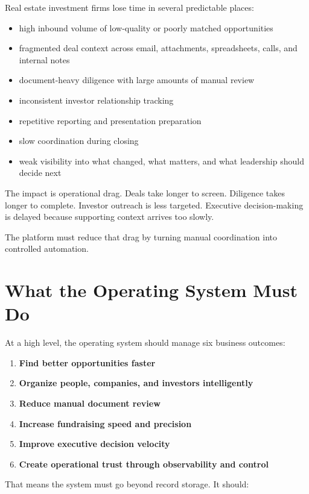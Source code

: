 \documentclass[11pt]{article}
\begin{document}
Real estate investment firms lose time in several predictable places:

\begin{itemize}
\item high inbound volume of low-quality or poorly matched opportunities
\item fragmented deal context across email, attachments, spreadsheets, calls, and internal notes
\item document-heavy diligence with large amounts of manual review
\item inconsistent investor relationship tracking
\item repetitive reporting and presentation preparation
\item slow coordination during closing
\item weak visibility into what changed, what matters, and what leadership should decide next
\end{itemize}

The impact is operational drag. Deals take longer to screen. Diligence takes longer to complete. Investor outreach is less targeted. Executive decision-making is delayed because supporting context arrives too slowly.

The platform must reduce that drag by turning manual coordination into controlled automation.

\section{What the Operating System Must Do}

At a high level, the operating system should manage six business outcomes:

\begin{enumerate}
\item \textbf{Find better opportunities faster}
\item \textbf{Organize people, companies, and investors intelligently}
\item \textbf{Reduce manual document review}
\item \textbf{Increase fundraising speed and precision}
\item \textbf{Improve executive decision velocity}
\item \textbf{Create operational trust through observability and control}
\end{enumerate}

That means the system must go beyond record storage. It should:
\end{document}
